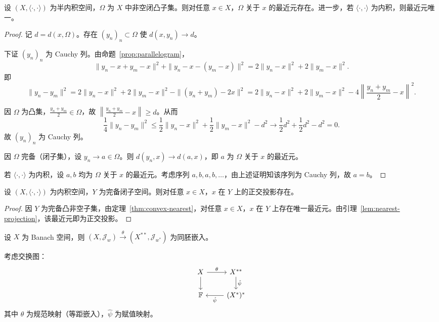 \documentclass[lang=cn,a4paper,newtx,section]{elegantbook}
\begin{document}
\begin{theorem}[凸集最近元存在唯一性]\label{thm:convex-nearest}
  设 $(X,\langle\cdot,\cdot\rangle)$ 为半内积空间，$\Omega$ 为 $X$ 中非空闭凸子集。则对任意 $x\in X$，$\Omega$ 关于 $x$ 的最近元存在。进一步，若 $\langle\cdot,\cdot\rangle$ 为内积，则最近元唯一。
\end{theorem}

\begin{proof}
  记 $d=d(x,\Omega)$。存在 $(y_n)_n\subset\Omega$ 使 $d(x,y_n)\to d$。

  下证 $(y_n)_n$ 为 Cauchy 列。由命题~\ref{prop:parallelogram}，
  \[
    \|y_n-x+y_m-x\|^2+\|y_n-x-(y_m-x)\|^2=2\|y_n-x\|^2+2\|y_m-x\|^2.
  \]
  即
  \[
    \|y_n-y_m\|^2=2\|y_n-x\|^2+2\|y_m-x\|^2-\|(y_n+y_m)-2x\|^2=2\|y_n-x\|^2+2\|y_m-x\|^2-4\left\|\frac{y_n+y_m}{2}-x\right\|^2.
  \]

  因 $\Omega$ 为凸集，$\frac{y_n+y_m}{2}\in\Omega$，故 $\left\|\frac{y_n+y_m}{2}-x\right\|\ge d$。从而
  \[
    \frac{1}{4}\|y_n-y_m\|^2\le\frac{1}{2}\|y_n-x\|^2+\frac{1}{2}\|y_m-x\|^2-d^2\to\frac{1}{2}d^2+\frac{1}{2}d^2-d^2=0.
  \]
  故 $(y_n)_n$ 为 Cauchy 列。

  因 $\Omega$ 完备（闭子集），设 $y_n\to a\in\Omega$。则 $d(y_n,x)\to d(a,x)$，即 $a$ 为 $\Omega$ 关于 $x$ 的最近元。

  若 $\langle\cdot,\cdot\rangle$ 为内积，设 $a,b$ 均为 $\Omega$ 关于 $x$ 的最近元。考虑序列 $a,b,a,b,\ldots$，由上述证明知该序列为 Cauchy 列，故 $a=b$。
\end{proof}

\begin{theorem}\label{thm:projection-complete-subspace}
  设 $(X,\langle\cdot,\cdot\rangle)$ 为内积空间，$Y$ 为完备闭子空间。则对任意 $x\in X$，$x$ 在 $Y$ 上的正交投影存在。
\end{theorem}

\begin{proof}
  因 $Y$ 为完备凸非空子集，由定理~\ref{thm:convex-nearest}，对任意 $x\in X$，$x$ 在 $Y$ 上存在唯一最近元。由引理~\ref{lem:nearest-projection}，该最近元即为正交投影。
\end{proof}

\begin{lemma}\label{lem:banach-weak-topology}
  设 $X$ 为 Banach 空间，则 $(X,\mathcal{J}_w)\xrightarrow{\theta}(X^{**},\mathcal{J}_{w^*})$ 为同胚嵌入。

  考虑交换图：
  \[
    \begin{tikzcd}
      X \arrow[r,"\theta"] \arrow[d] & X^{**} \arrow[d,"\hat{\psi}"] \\
      \mathbb{F} & (X^*)^* \arrow[l,"\hat{\psi}"]
    \end{tikzcd}
  \]
  其中 $\theta$ 为规范映射（等距嵌入），$\hat{\psi}$ 为赋值映射。
\end{lemma}
\end{document}
